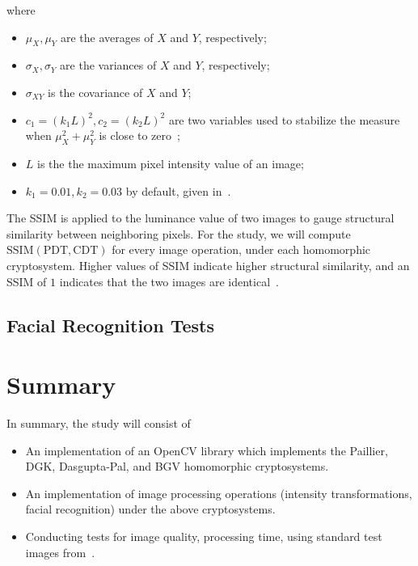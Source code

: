 \begin{description}
	where
	\begin{itemize}
		\item $\mu_X, \mu_Y$ are the averages of $X$ and $Y$, respectively;
		\item $\sigma_X, \sigma_Y$ are the variances of $X$ and $Y$, respectively;
		\item $\sigma_{XY}$ is the covariance of $X$ and $Y$;
		\item $c_1 = (k_1L)^2, c_2 = (k_2L)^2$ are two variables used to stabilize the measure when $\mu_X^2+\mu_Y^2$ is close to zero~\cite{akramullah_video_2014};
		\item $L$ is the the maximum pixel intensity value of an image;
		\item $k_1 = 0.01, k_2 = 0.03$ by default, given in~\cite{ahmed_benchmark_2016}.
	\end{itemize}
	The SSIM is applied to the luminance value of two images to gauge structural similarity between neighboring pixels.
    For the study, we will compute $\mathrm{SSIM}(\mathrm{PDT}, \mathrm{CDT})$ for every image operation, under each homomorphic cryptosystem. Higher values of SSIM indicate higher structural similarity, and an SSIM of $1$ indicates that the two images are identical~\cite{ahmed_benchmark_2016}.
\end{description}

\subsection{Facial Recognition Tests}

\section{Summary}
In summary, the study will consist of
\begin{itemize}
	\item An implementation of an OpenCV library which implements the Paillier, DGK, Dasgupta-Pal, and BGV homomorphic cryptosystems.
	\item An implementation of image processing operations (intensity transformations, facial recognition) under the above cryptosystems.
	\item Conducting tests for image quality, processing time, using standard test images from~\cite{gonzalez_image_nodate}.
\end{itemize}

